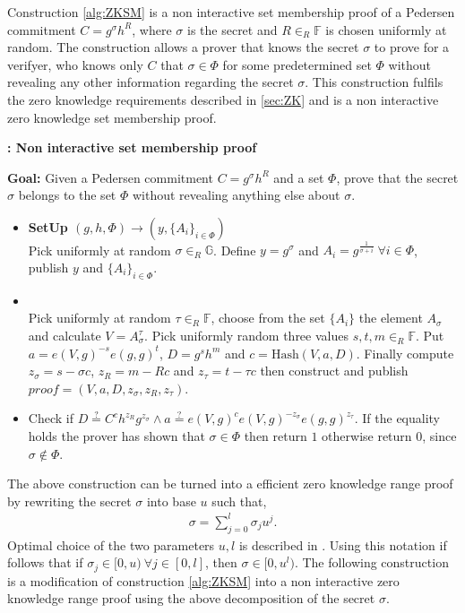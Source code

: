 Construction \ref{alg:ZKSM} is a non interactive set membership proof of a Pedersen commitment $C=g^\sigma h^R$, where $\sigma$ is the secret and $R\in_R\mathds{F}$ is chosen uniformly at random. The construction allows a prover that knows the secret $\sigma$ to prove for a verifyer, who knows only $C$ that $\sigma\in\Phi$ for some predetermined set $\Phi$ without revealing any other information regarding the secret $\sigma$. This construction fulfils the zero knowledge requirements described in \ref{sec:ZK} and is a non interactive zero knowledge set membership proof. 
\begin{algorithm}[H]
\caption{\textbf{: Non interactive set membership proof}}
\textbf{Goal:} Given a Pedersen commitment $C=g^\sigma h^R$ and a set $\Phi$, prove that the secret $\sigma$ belongs to the set $\Phi$ without revealing anything else about $\sigma$.
\vspace{2pt} \hline \vspace{2pt}
\begin{itemize}
  \item\textbf{SetUp $(g,h,\Phi)\xrightarrow[]{}(y,\{A_{i}\}_{i\in\Phi})$}\\
Pick uniformly at random $\sigma\in_R\mathds{G}$. Define $y=g^\sigma$ and $A_i=g^{\frac{1}{\sigma+i}} \:\forall i\in\Phi$, publish $y$ and $\{A_i\}_{i\in\Phi}$.

\item{}\\
Pick uniformly at random $\tau\in_R\mathds{F}$, choose from the set $\{A_i\}$ the element $A_\sigma$ and calculate $V=A_\sigma^\tau$. Pick uniformly random three values $s,t,m\in_R\mathds{F}$. Put $a=e(V,g)^{-s}e(g,g)^t$, $D=g^sh^m$ and $c=\text{Hash}(V,a,D)$. Finally compute $z_\sigma = s-\sigma c$, $z_R = m-Rc$ and $z_\tau= t-\tau c$ then construct and publish $\textit{proof} = (V,a,D,z_\sigma,z_R,z_\tau)$.

\item{}
Check if $D\overset{?}{=}C^ch^{z_R}g^{z_\sigma}\wedge a \overset{?}{=} e(V,g)^c e(V,g)^{-z_\sigma}e(g,g)^{z_\tau}$. If the equality holds the prover has shown that $\sigma\in\Phi$ then return $1$ otherwise return $0$, since $\sigma\notin\Phi$.
\end{itemize}
\label{alg:ZKSM}
\end{algorithm}

The above construction can be turned into a efficient zero knowledge range proof by rewriting the secret $\sigma$ into base $u$ such that,
\begin{align*}
    \sigma = \sum_{j=0}^l \sigma_ju^j.
\end{align*}
Optimal choice of the two parameters $u,l$ is described in \cite{PR}. 
Using this notation if follows that if $\sigma_j\in[0,u)\: \forall j\in[0,l]$, then $\sigma\in[0,u^l)$. The following construction is a modification of construction \ref{alg:ZKSM} into a non interactive zero knowledge range proof using the above decomposition of the secret $\sigma$.

